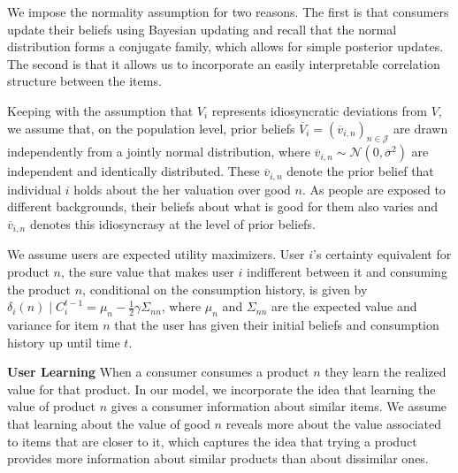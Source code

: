 \documentclass[sigconf, anonymous, review]{acmart}
\begin{document}
We impose the normality assumption for two reasons. The first is that consumers update their beliefs using Bayesian updating and recall that the normal distribution forms a conjugate family, which allows for simple posterior updates. The second is that it allows us to incorporate an easily interpretable correlation structure between the items.
\par
Keeping with the assumption that $V_i$ represents idiosyncratic deviations from $V$, we assume that, on the population level, prior beliefs $\overline V_i=\left(\overline v_{i,n}\right)_{n \in \mathcal{J}}$ are drawn independently from a jointly normal distribution, where $\overline v_{i,n} \sim \mathcal N (0, \overline \sigma^2)$ are independent and identically distributed. These $\overline v_{i,n}$ denote the prior belief that individual $i$ holds about the her valuation over good $n$. As people are exposed to different backgrounds, their beliefs about what is good for them also varies and $\overline v_{i,n}$ denotes this idiosyncrasy at the level of prior beliefs.
\par

We assume users are expected utility maximizers. User $i$'s certainty equivalent for product $n$, the sure value that makes user $i$ indifferent between it and consuming the product $n$, conditional on the consumption history, is given by
$\delta_{i}(n)\mid C_i^{t-1}=\mu_n-\frac{1}{2}\gamma \Sigma_{nn}$, where $\mu_n$ and $\Sigma_{nn}$ are the expected value and variance for item $n$ that the user has given their initial beliefs and consumption history up until time $t$.

\noindent \textbf{User Learning}
When a consumer consumes a product $n$ they learn the realized value for that product. In our model, we incorporate the idea that learning the value of product $n$ gives a consumer information about similar items. 
We assume that learning about the value of good $n$ reveals more about the value associated to items that are closer to it, which captures the idea that trying a product provides more information about similar products than about dissimilar ones.
\par
\end{document}
